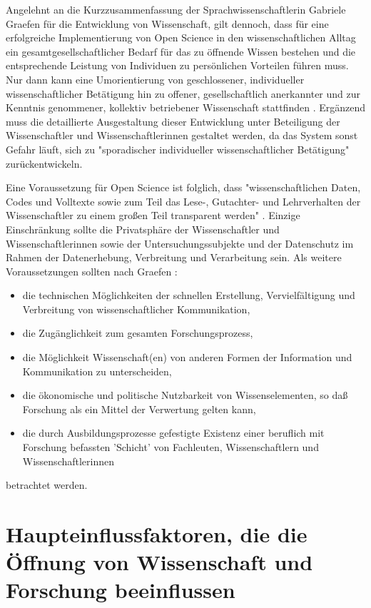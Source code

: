 Angelehnt an die Kurzzusammenfassung der Sprachwissenschaftlerin Gabriele Graefen für die Entwicklung von Wissenschaft, gilt dennoch, dass für eine erfolgreiche Implementierung von Open Science in den wissenschaftlichen Alltag ein gesamtgesellschaftlicher Bedarf für das zu öffnende Wissen bestehen und die entsprechende Leistung von Individuen zu persönlichen Vorteilen führen muss. Nur dann kann eine Umorientierung von geschlossener, individueller wissenschaftlicher Betätigung hin zu offener, gesellschaftlich anerkannter und zur Kenntnis genommener, kollektiv betriebener Wissenschaft stattfinden \cite{Graefen_2007}. Ergänzend muss die detaillierte Ausgestaltung dieser Entwicklung unter Beteiligung der Wissenschaftler und Wissenschaftlerinnen gestaltet werden, da das System sonst Gefahr läuft, sich zu "sporadischer individueller wissenschaftlicher Betätigung" \cite{Graefen_2007} zu­rück­ent­wi­ckeln.

Eine Voraussetzung für Open Science ist folglich, dass "wissenschaftlichen Daten, Codes und Volltexte sowie zum Teil das Lese-, Gutachter- und Lehrverhalten der Wissenschaftler zu einem großen Teil transparent werden" \cite{Brembs_2015}. Einzige Einschränkung sollte die Privatsphäre der Wissenschaftler und Wissenschaftlerinnen sowie der Untersuchungssubjekte und der Datenschutz im Rahmen der Datenerhebung, Verbreitung und Verarbeitung sein. Als weitere Voraussetzungen sollten nach Graefen \cite{Graefen_2007}:
\begin{itemize}
\item die technischen Möglichkeiten der schnellen Erstellung, Vervielfältigung und Verbreitung von wissenschaftlicher Kommunikation,
\item die Zugänglichkeit zum gesamten Forschungsprozess,
\item die Möglichkeit Wissenschaft(en) von anderen Formen der Information und Kommunikation zu unterscheiden,
\item die ökonomische und politische Nutzbarkeit von Wissenselementen, so daß Forschung als ein Mittel der Verwertung gelten kann,
\item die durch Ausbildungsprozesse gefestigte Existenz einer beruflich mit Forschung befassten 'Schicht' von Fachleuten, Wissenschaftlern und Wissenschaftlerinnen
\end{itemize}
betrachtet werden.

\section{Haupteinflussfaktoren, die die Öffnung von Wissenschaft und Forschung beeinflussen}

